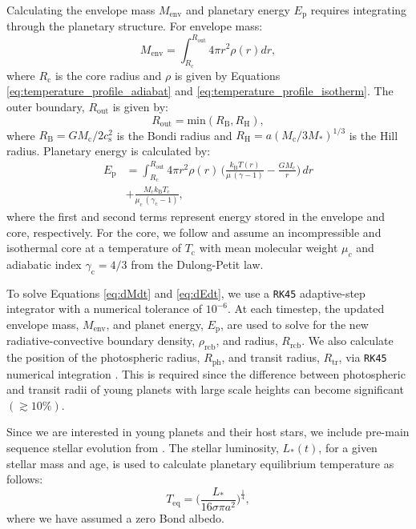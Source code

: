 \documentclass[fleqn,usenatbib]{mnras}
\begin{document}
Calculating the envelope mass $M_\text{env}$ and planetary energy $E_\text{p}$ requires integrating through the planetary structure. For envelope mass:
\begin{equation}
    M_\text{env} = \int_{R_\text{c}}^{R_\text{out}} 4 \pi r^2 \rho(r) dr,
\end{equation}
where $R_\text{c}$ is the core radius and $\rho$ is given by Equations \ref{eq:temperature_profile_adiabat} and \ref{eq:temperature_profile_isotherm}. The outer boundary, $R_\text{out}$ is given by: 
\begin{equation}
    R_\text{out} = \text{min} ( R_\text{B}, R_\text{H} ),
\end{equation}
where $R_\text{B} = G M_\text{c} / 2 c_\text{s}^2$ is the Bondi radius and $R_\text{H} = a (M_\text{c} / 3M_*)^{1/3}$ is the Hill radius. Planetary energy is calculated by:
\begin{equation}
\begin{split}
    E_\text{p} & = \int_{R_\text{c}}^{R_\text{out}} 4 \pi r^2 \rho(r) \, \bigg( \frac{k_\text{B} T(r)}{ \mu \,(\gamma - 1) } - \frac{GM_\text{c}}{r} \bigg) \, dr \\
    & + \frac{M_\text{c} k_\text{B} T_\text{c}}{\mu_\text{c} \, (\gamma_\text{c} - 1)} ,
\end{split}
\end{equation}
where the first and second terms represent energy stored in the envelope and core, respectively. For the core, we follow \citet{Misener2021} and assume an incompressible and isothermal core at a temperature of $T_\text{c}$ with mean molecular weight $\mu_c$ and adiabatic index $\gamma_\text{c} = 4/3$ from the Dulong-Petit law. 

To solve Equations \ref{eq:dMdt} and \ref{eq:dEdt}, we use a \verb|RK45| adaptive-step integrator with a numerical tolerance of $10^{-6}$. At each timestep, the updated envelope mass, $M_\text{env}$, and planet energy, $E_\text{p}$, are used to solve for the new radiative-convective boundary density, $\rho_\text{rcb}$, and radius, $R_\text{rcb}$. We also calculate the position of the photospheric radius, $R_\text{ph}$, and transit radius, $R_\text{tr}$, via \verb|RK45| numerical integration \citep[e.g.][]{Guillot2010}. This is required since the difference between photospheric and transit radii of young planets with large scale heights can become significant $(\gtrsim 10\%) $.

Since we are interested in young planets and their host stars, we include pre-main sequence stellar evolution from \citet{Johnstone2021}. The stellar luminosity, $L_*(t)$, for a given stellar mass and age, is used to calculate planetary equilibrium temperature as follows:
\begin{equation}
    T_\text{eq} = \bigg( \frac{L_*}{16 \sigma \pi a^2} \bigg)^\frac{1}{4},
\end{equation}
where we have assumed a zero Bond albedo. 
\end{document}
